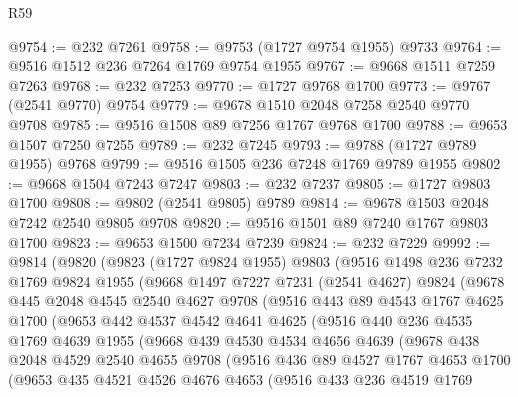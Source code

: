 \begin{lexlean}{R59}
\begin{coremodule}
@9754 := @232 @7261
@9758 := @9753 (@1727 @9754 @1955) @9733
@9764 := @9516 @1512 @236 @7264 @1769 @9754 @1955
@9767 := @9668 @1511 @7259 @7263
@9768 := @232 @7253
@9770 := @1727 @9768 @1700
@9773 := @9767 (@2541 @9770) @9754
@9779 := @9678 @1510 @2048 @7258 @2540 @9770 @9708
@9785 := @9516 @1508 @89 @7256 @1767 @9768 @1700
@9788 := @9653 @1507 @7250 @7255
@9789 := @232 @7245
@9793 := @9788 (@1727 @9789 @1955) @9768
@9799 := @9516 @1505 @236 @7248 @1769 @9789 @1955
@9802 := @9668 @1504 @7243 @7247
@9803 := @232 @7237
@9805 := @1727 @9803 @1700
@9808 := @9802 (@2541 @9805) @9789
@9814 := @9678 @1503 @2048 @7242 @2540 @9805 @9708
@9820 := @9516 @1501 @89 @7240 @1767 @9803 @1700
@9823 := @9653 @1500 @7234 @7239
@9824 := @232 @7229
@9992 := @9814
    (@9820
      (@9823
        (@1727 @9824 @1955)
        @9803
        (@9516
          @1498
          @236
          @7232
          @1769
          @9824
          @1955
          (@9668
            @1497
            @7227
            @7231
            (@2541 @4627)
            @9824
            (@9678
              @445
              @2048
              @4545
              @2540
              @4627
              @9708
              (@9516
                @443
                @89
                @4543
                @1767
                @4625
                @1700
                (@9653
                  @442
                  @4537
                  @4542
                  @4641
                  @4625
                  (@9516
                    @440
                    @236
                    @4535
                    @1769
                    @4639
                    @1955
                    (@9668
                      @439
                      @4530
                      @4534
                      @4656
                      @4639
                      (@9678
                        @438
                        @2048
                        @4529
                        @2540
                        @4655
                        @9708
                        (@9516
                          @436
                          @89
                          @4527
                          @1767
                          @4653
                          @1700
                          (@9653
                            @435
                            @4521
                            @4526
                            @4676
                            @4653
                            (@9516
                              @433
                              @236
                              @4519
                              @1769

\end{coremodule}
\end{lexlean}
